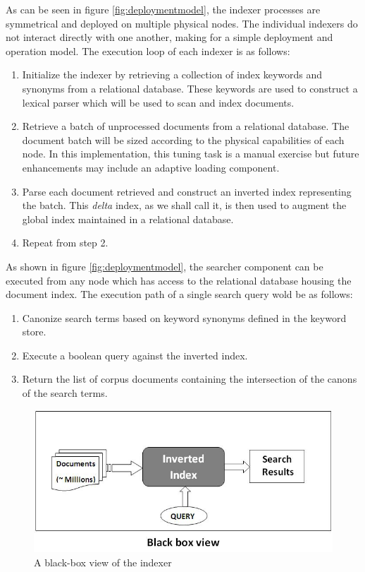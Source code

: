 \documentclass[10pt]{report}
\begin{document}
As can be seen in figure \ref{fig:deploymentmodel}, the indexer
processes are symmetrical and deployed on multiple physical nodes. The
individual indexers do not interact directly with one another, making
for a simple deployment and operation model. The execution loop of
each indexer is as follows:

\begin{enumerate}
\item Initialize the indexer by retrieving a collection of index
  keywords and synonyms from a relational database. These keywords are
  used to construct a lexical parser which will be used to scan and
  index documents.
\item Retrieve a batch of unprocessed documents from a relational
  database. The document batch will be sized according to the physical
  capabilities of each node. In this implementation, this tuning task
  is a manual exercise but future enhancements may include an adaptive
  loading component.
\item Parse each document retrieved and construct an inverted index
  representing the batch. This \textit{delta} index, as we shall call
  it, is then used to augment the global index maintained in a
  relational database.
\item Repeat from step 2.
\end{enumerate}

As shown in figure \ref{fig:deploymentmodel}, the searcher component
can be executed from any node which has access to the relational
database housing the document index. The execution path of a single
search query wold be as follows:

\begin{enumerate}
  \item Canonize search terms based on keyword synonyms defined in the
    keyword store.
  \item Execute a boolean query against the inverted index.
  \item Return the list of corpus documents containing the
    intersection of the canons of the search terms.
\end{enumerate}

\begin{figure}
  \begin{center}
        \includegraphics[width=\textwidth,height=!]{blackbox}
  \end{center}
  \caption{A black-box view of the indexer}
  \label{fig:blackbox}
\end{figure} 
\end{document}
